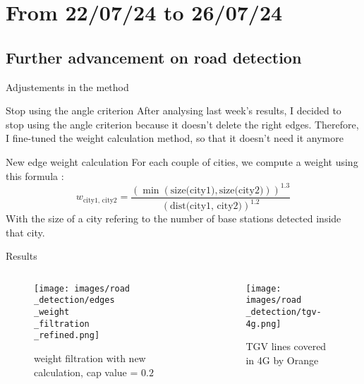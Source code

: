 \smallframetitle

\section{From 22/07/24 to 26/07/24}
\insertsectionframe

\subsection{Further advancement on road detection}
\insertsubsectionframe

\begin{frame}{Adjustements in the method}
    \begin{block}{Stop using the angle criterion}
        After analysing last week's results, I decided to stop using the angle criterion because it doesn't delete the right edges.
        Therefore, I fine-tuned the weight calculation method, so that it doesn't need it anymore
    \end{block}
    \begin{block}{New edge weight calculation}
        For each couple of cities, we compute a weight using this formula :
        $$w_{\text{city1, city2}} = \frac{(\min(\text{size(city1)},\text{size(city2)}))^{1.3}}{(\text{dist(city1, city2)})^{1.2}}$$
        With the size of a city refering to the number of base stations detected inside that city.
    \end{block}
\end{frame}

\begin{frame}{Results}
    \begin{columns}
        \begin{column}{0.5\textwidth}
            \begin{figure}
                \texttt{[image: images/road\\\_detection/edges\\\_weight\\\_filtration\\\_refined.png]}
                \caption{weight filtration with new calculation, cap value = $0.2$}
            \end{figure}
        \end{column}
        \begin{column}{0.5\textwidth}
            \begin{figure}
                \texttt{[image: images/road\\\_detection/tgv-4g.png]}
                \caption{TGV lines covered in 4G by Orange}
            \end{figure}
        \end{column}
    \end{columns}        
\end{frame}

